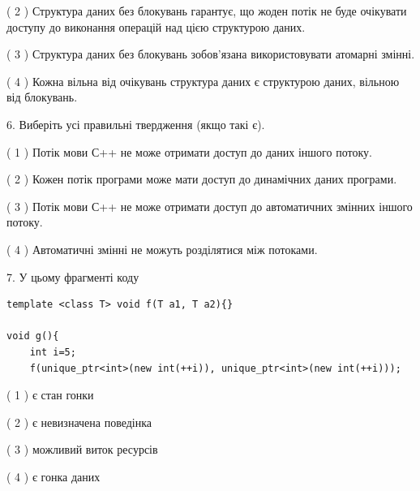 \documentclass[12pt, ukrainian]{article}
\begin{document}
\begin {large}
{( 2 ) Структура даних без блокувань гарантує, що жоден потік не буде очікувати доступу до виконання операцій над цією структурою даних.%

( 3 ) Структура даних без блокувань зобов’язана використовувати атомарні змінні.%

( 4 ) Кожна вільна від очікувань структура даних є структурою даних, вільною від блокувань.%
\newpage



\vspace{5mm}
6. Виберіть усі правильні твердження (якщо такі є).\par
\vspace{2mm}

( 1 ) Потік мови С++ не може отримати доступ до даних іншого потоку.%

( 2 ) Кожен потік програми може мати доступ до динамічних даних програми.%

( 3 ) Потік мови С++ не може отримати доступ до автоматичних змінних іншого потоку.%

( 4 ) Автоматичні змінні не можуть розділятися між потоками.%


\vspace{5mm}
7. У цьому фрагменті коду
\begin{verbatim}
template <class T> void f(T a1, T a2){}

void g(){
    int i=5;
    f(unique_ptr<int>(new int(++i)), unique_ptr<int>(new int(++i)));
\end{verbatim}

( 1 ) є стан гонки%

( 2 ) є невизначена поведінка%

( 3 ) можливий виток ресурсів%

( 4 ) є гонка даних%
}
\end {large}
\end{document}

